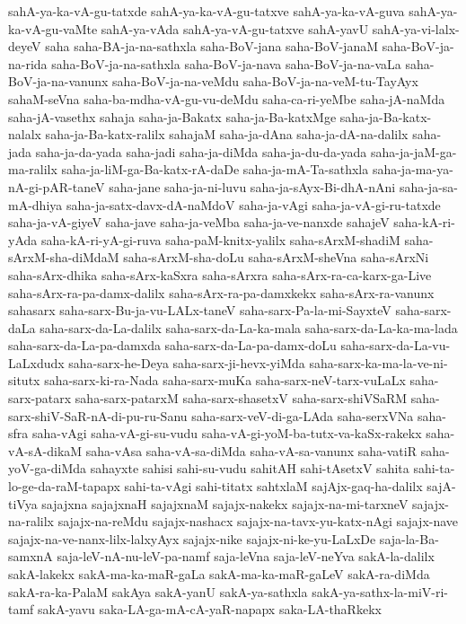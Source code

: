 {sahA-ya-ka-vA-gu-tatxde
sahA-ya-ka-vA-gu-tatxve
sahA-ya-ka-vA-guva
sahA-ya-ka-vA-gu-vaMte
sahA-ya-vAda
sahA-ya-vA-gu-tatxve
sahA-yavU
sahA-ya-vi-lalx-deyeV
saha
saha-BA-ja-na-sathxla
saha-BoV-jana
saha-BoV-janaM
saha-BoV-ja-na-rida
saha-BoV-ja-na-sathxla
saha-BoV-ja-nava
saha-BoV-ja-na-vaLa
saha-BoV-ja-na-vanunx
saha-BoV-ja-na-veMdu
saha-BoV-ja-na-veM-tu-TayAyx
sahaM-seVna
saha-ba-mdha-vA-gu-vu-deMdu
saha-ca-ri-yeMbe
saha-jA-naMda
saha-jA-vasethx
sahaja
saha-ja-Bakatx
saha-ja-Ba-katxMge
saha-ja-Ba-katx-nalalx
saha-ja-Ba-katx-ralilx
sahajaM
saha-ja-dAna
saha-ja-dA-na-dalilx
saha-jada
saha-ja-da-yada
saha-jadi
saha-ja-diMda
saha-ja-du-da-yada
saha-ja-jaM-ga-ma-ralilx
saha-ja-liM-ga-Ba-katx-rA-daDe
saha-ja-mA-Ta-sathxla
saha-ja-ma-ya-nA-gi-pAR-taneV
saha-jane
saha-ja-ni-luvu
saha-ja-sAyx-Bi-dhA-nAni
saha-ja-sa-mA-dhiya
saha-ja-satx-davx-dA-naMdoV
saha-ja-vAgi
saha-ja-vA-gi-ru-tatxde
saha-ja-vA-giyeV
saha-jave
saha-ja-veMba
saha-ja-ve-nanxde
sahajeV
saha-kA-ri-yAda
saha-kA-ri-yA-gi-ruva
saha-paM-knitx-yalilx
saha-sArxM-shadiM
saha-sArxM-sha-diMdaM
saha-sArxM-sha-doLu
saha-sArxM-sheVna
saha-sArxNi
saha-sArx-dhika
saha-sArx-kaSxra
saha-sArxra
saha-sArx-ra-ca-karx-ga-Live
saha-sArx-ra-pa-damx-dalilx
saha-sArx-ra-pa-damxkekx
saha-sArx-ra-vanunx
sahasarx
saha-sarx-Bu-ja-vu-LALx-taneV
saha-sarx-Pa-la-mi-SayxteV
saha-sarx-daLa
saha-sarx-da-La-dalilx
saha-sarx-da-La-ka-mala
saha-sarx-da-La-ka-ma-lada
saha-sarx-da-La-pa-damxda
saha-sarx-da-La-pa-damx-doLu
saha-sarx-da-La-vu-LaLxdudx
saha-sarx-he-Deya
saha-sarx-ji-hevx-yiMda
saha-sarx-ka-ma-la-ve-ni-situtx
saha-sarx-ki-ra-Nada
saha-sarx-muKa
saha-sarx-neV-tarx-vuLaLx
saha-sarx-patarx
saha-sarx-patarxM
saha-sarx-shasetxV
saha-sarx-shiVSaRM
saha-sarx-shiV-SaR-nA-di-pu-ru-Sanu
saha-sarx-veV-di-ga-LAda
saha-serxVNa
saha-sfra
saha-vAgi
saha-vA-gi-su-vudu
saha-vA-gi-yoM-ba-tutx-va-kaSx-rakekx
saha-vA-sA-dikaM
saha-vAsa
saha-vA-sa-diMda
saha-vA-sa-vanunx
saha-vatiR
saha-yoV-ga-diMda
sahayxte
sahisi
sahi-su-vudu
sahitAH
sahi-tAsetxV
sahita
sahi-ta-lo-ge-da-raM-tapapx
sahi-ta-vAgi
sahi-titatx
sahtxlaM
sajAjx-gaq-ha-dalilx
sajA-tiVya
sajajxna
sajajxnaH
sajajxnaM
sajajx-nakekx
sajajx-na-mi-tarxneV
sajajx-na-ralilx
sajajx-na-reMdu
sajajx-nashacx
sajajx-na-tavx-yu-katx-nAgi
sajajx-nave
sajajx-na-ve-nanx-lilx-lalxyAyx
sajajx-nike
sajajx-ni-ke-yu-LaLxDe
saja-la-Ba-samxnA
saja-leV-nA-nu-leV-pa-namf
saja-leVna
saja-leV-neYva
sakA-la-dalilx
sakA-lakekx
sakA-ma-ka-maR-gaLa
sakA-ma-ka-maR-gaLeV
sakA-ra-diMda
sakA-ra-ka-PalaM
sakAya
sakA-yanU
sakA-ya-sathxla
sakA-ya-sathx-la-miV-ri-tamf
sakA-yavu
saka-LA-ga-mA-cA-yaR-napapx
saka-LA-thaRkekx
}

